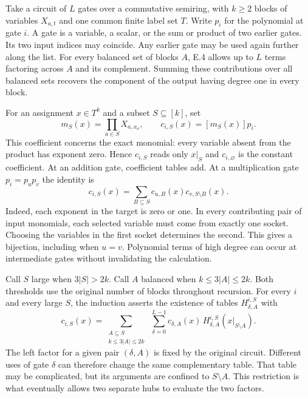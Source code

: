 \clearpage
{}\label{sec:gate}

Take a circuit of $L$ gates over a commutative semiring, with $k\ge2$ blocks of variables $X_{a,t}$ and one common finite label set $T$. Write $p_i$ for the polynomial at gate $i$. A gate is a variable, a scalar, or the sum or product of two earlier gates. Its two input indices may coincide. Any earlier gate may be used again further along the list. For every balanced set of blocks $A$, E.4 allows up to $L$ terms factoring across $A$ and its complement. Summing these contributions over all balanced sets recovers the component of the output having degree one in every block.

For an assignment $x\in T^k$ and a subset $S\subseteq[k]$, set
\[
 m_S(x)=\prod_{a\in S}X_{a,x_a},\qquad
 c_{i,S}(x)=[m_S(x)]p_i .
\]
This coefficient concerns the exact monomial: every variable absent from the product has exponent zero. Hence $c_{i,S}$ reads only $x|_S$ and $c_{i,\varnothing}$ is the constant coefficient. At an addition gate, coefficient tables add. At a multiplication gate $p_i=p_u p_v$ the identity is
\begin{equation*}
 c_{i,S}(x)=\sum_{B\subseteq S} c_{u,B}(x)c_{v,S\setminus B}(x).
\end{equation*}
Indeed, each exponent in the target is zero or one. In every contributing pair of input monomials, each selected variable must come from exactly one socket. Choosing the variables in the first socket determines the second. This gives a bijection, including when $u=v$. Polynomial terms of high degree can occur at intermediate gates without invalidating the calculation.

Call $S$ large when $3|S|>2k$. Call $A$ balanced when $k\le3|A|\le2k$. Both thresholds use the original number of blocks throughout recursion. For every $i$ and every large $S$, the induction asserts the existence of tables $H^{i,S}_{\delta,A}$ with
\begin{equation*}
 c_{i,S}(x)=
 \sum_{\substack{A\subseteq S\\ k\le3|A|\le2k}}\;
 \sum_{\delta=0}^{L-1}
 c_{\delta,A}(x)\,H^{i,S}_{\delta,A}(x|_{S\setminus A}).
\end{equation*}
The left factor for a given pair $(\delta,A)$ is fixed by the original circuit. Different uses of gate $\delta$ can therefore change the same complementary table. That table may be complicated, but its arguments are confined to $S\setminus A$. This restriction is what eventually allows two separate hubs to evaluate the two factors.

